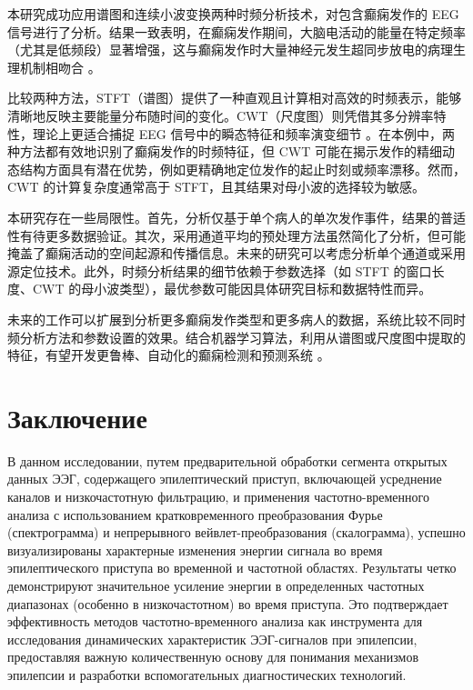 \documentclass{article}
\providecommand{\pcsync}{\par\vspace{\baselineskip}} %
\begin{document}
\begin{paracol}{2}
本研究成功应用谱图和连续小波变换两种时频分析技术，对包含癫痫发作的 EEG 信号进行了分析。结果一致表明，在癫痫发作期间，大脑电活动的能量在特定频率（尤其是低频段）显著增强，这与癫痫发作时大量神经元发生超同步放电的病理生理机制相吻合 \cite{Jiruska2013}。

比较两种方法，STFT（谱图）提供了一种直观且计算相对高效的时频表示，能够清晰地反映主要能量分布随时间的变化。CWT（尺度图）则凭借其多分辨率特性，理论上更适合捕捉 EEG 信号中的瞬态特征和频率演变细节 \cite{Torrence1998}。在本例中，两种方法都有效地识别了癫痫发作的时频特征，但 CWT 可能在揭示发作的精细动态结构方面具有潜在优势，例如更精确地定位发作的起止时刻或频率漂移。然而，CWT 的计算复杂度通常高于 STFT，且其结果对母小波的选择较为敏感。

本研究存在一些局限性。首先，分析仅基于单个病人的单次发作事件，结果的普适性有待更多数据验证。其次，采用通道平均的预处理方法虽然简化了分析，但可能掩盖了癫痫活动的空间起源和传播信息。未来的研究可以考虑分析单个通道或采用源定位技术。此外，时频分析结果的细节依赖于参数选择（如 STFT 的窗口长度、CWT 的母小波类型），最优参数可能因具体研究目标和数据特性而异。

未来的工作可以扩展到分析更多癫痫发作类型和更多病人的数据，系统比较不同时频分析方法和参数设置的效果。结合机器学习算法，利用从谱图或尺度图中提取的特征，有望开发更鲁棒、自动化的癫痫检测和预测系统 \cite{Boashash2015}。
\switchcolumn* %

\section{Заключение}
\pcsync

В данном исследовании, путем предварительной обработки сегмента открытых данных ЭЭГ, содержащего эпилептический приступ, включающей усреднение каналов и низкочастотную фильтрацию, и применения частотно-временного анализа с использованием кратковременного преобразования Фурье (спектрограмма) и непрерывного вейвлет-преобразования (скалограмма), успешно визуализированы характерные изменения энергии сигнала во время эпилептического приступа во временной и частотной областях. Результаты четко демонстрируют значительное усиление энергии в определенных частотных диапазонах (особенно в низкочастотном) во время приступа. Это подтверждает эффективность методов частотно-временного анализа как инструмента для исследования динамических характеристик ЭЭГ-сигналов при эпилепсии, предоставляя важную количественную основу для понимания механизмов эпилепсии и разработки вспомогательных диагностических технологий.


\end{paracol}
\end{document}
